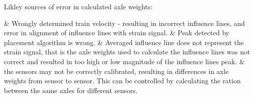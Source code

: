 Likley sources of error in calculated axle weights:
\newline
\begin{easylist}[itemize]
	& Wrongly determined train velocity - resulting in incorrect influence lines, and error in alignment of influence lines with strain signal.
	& Peak detected by placement algorithm is wrong.
	& Averaged influence line does not represent the strain signal, that is the axle weights used to calculate the influence lines was not correct and resulted in too high or low magnitude of the influence lines peak.
		& the sensors may not be correctly calibrated, resulting in differences in axle weights from sensor to sensor. This can be controlled by calculating the ration between the same axles for different sensors.
\end{easylist}
